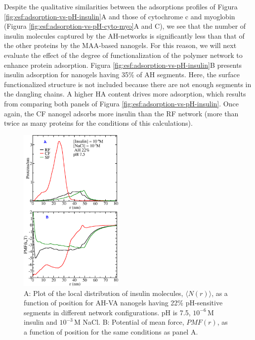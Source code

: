 {Despite the qualitative similarities between the adsorptions profiles of
Figura \ref{fig:esf:adsorption-vs-pH-insulin}A and those of cytochrome c and myoglobin (Figura \ref{fig:esf:adsorption-vs-pH-cyto-myo}A and C), we see that the number of insulin molecules captured by the AH-networks is significantly less than that of the other proteins by the MAA-based nanogels.
For this reason, we  will next evaluate the effect of the degree of functionalization of the polymer network to enhance protein adsorption.
Figura \ref{fig:esf:adsorption-vs-pH-insulin}B presents insulin adsorption for nanogels having 35\% of AH segments.
Here, the surface functionalized structure is not included because there are not enough segments in the dangling chains.
A higher HA content drives more adsorption, which results from comparing both panels of Figura \ref{fig:esf:adsorption-vs-pH-insulin}.
Once again, the CF nanogel adsorbs more insulin than the RF network (more than twice as many proteins for the conditions of this calculations).




\begin{figure}[!htb]
    \centering
    \includegraphics[width=0.45\textwidth]{Figures/graphs-gel2/insu-ads-pmf.png}
    \caption{A: Plot of the local distribution of insulin molecules, $\langle N(r)\rangle$, as a function of position for AH-VA nanogels having 22\% pH-sensitive segments in different network configurations.
    pH is 7.5, $10^{-6}$\,M insulin and  $10^{-3}$\,M NaCl.
    B: Potential of mean force,  ${PMF}(r)$, as a function of position for the same conditions as panel A.}
    \label{fig:esf:adsorption-vs-r-insulin}
\end{figure}



}
